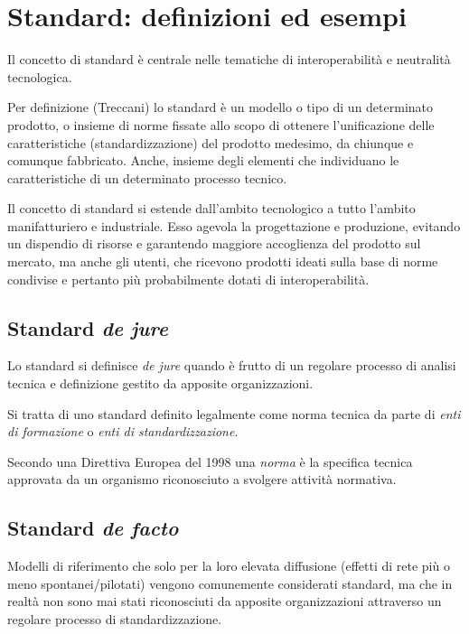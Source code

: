 \section{Standard: definizioni ed esempi}

Il concetto di standard è centrale nelle tematiche di interoperabilità e neutralità tecnologica.

Per definizione (Treccani) lo standard è un modello o tipo di un determinato prodotto, o insieme di norme fissate allo scopo di ottenere l'unificazione delle caratteristiche (standardizzazione) del prodotto medesimo, da chiunque e comunque fabbricato. 
Anche, insieme degli elementi che individuano le caratteristiche di un determinato processo tecnico.


Il concetto di standard si estende dall'ambito tecnologico a tutto l'ambito manifatturiero e industriale. 
Esso agevola la progettazione e produzione, evitando un dispendio di risorse e garantendo maggiore accoglienza del prodotto sul mercato, ma anche gli utenti, che ricevono prodotti ideati sulla base di norme condivise e pertanto più probabilmente dotati di interoperabilità.

\subsection{Standard \textit{de jure}}
Lo standard si definisce \textit{de jure} quando è frutto di un regolare processo di analisi tecnica e definizione gestito da apposite organizzazioni.

Si tratta di uno standard definito legalmente come norma tecnica da parte di \textit{enti di formazione} o \textit{enti di standardizzazione}.

Secondo una Direttiva Europea del 1998 una \textit{norma} è la specifica tecnica approvata da un organismo riconosciuto a svolgere attività normativa.

\subsection{Standard \textit{de facto}}
Modelli di riferimento che solo per la loro elevata diffusione (effetti di rete più o meno spontanei/pilotati) vengono comunemente considerati standard, ma che in realtà non sono mai stati riconosciuti da apposite organizzazioni attraverso un regolare processo di standardizzazione. 
